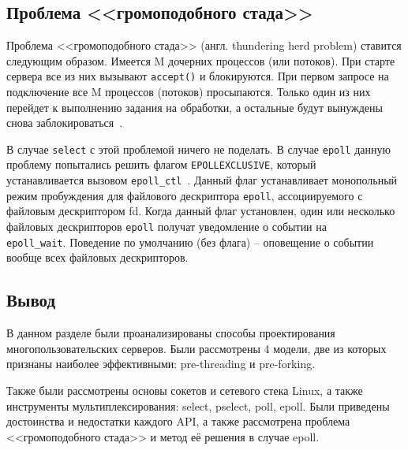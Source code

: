 \subsection{Проблема <<громоподобного стада>>}

Проблема <<громоподобного стада>> (англ. thundering herd problem) ставится следующим образом. Имеется M дочерних процессов (или потоков). При старте сервера все из них вызывают \texttt{accept()} и блокируются. При первом запросе на подключение все M процессов (потоков) просыпаются. Только один из них перейдет к выполнению задания на обработки, а остальные будут вынуждены снова заблокироваться~\cite{Tiwari2012ASP}.

В случае \texttt{select} с этой проблемой ничего не поделать. В случае \texttt{epoll} данную проблему попытались решить флагом \texttt{EPOLLEXCLUSIVE}, который \\устанавливается вызовом \texttt{epoll\_ctl}~\cite{man-epoll-ctl}. Данный флаг устанавливает монопольный режим пробуждения для файлового дескриптора \texttt{epoll}, ассоциируемого с файловым дескриптором fd. Когда данный флаг установлен, один или несколько файловых дескрипторов \texttt{epoll} получат уведомление о событии на \\\texttt{epoll\_wait}. Поведение по умолчанию (без флага) -- оповещение о событии вообще всех файловых дескрипторов.


\subsection*{Вывод}

В данном разделе были проанализированы способы проектирования многопользовательских серверов. Были рассмотрены 4 модели, две из которых признаны наиболее эффективными: pre-threading и pre-forking. 

Также были рассмотрены основы сокетов и сетевого стека Linux, а также инструменты мультиплексирования: select, pselect, poll, epoll. Были приведены достоинства и недостатки каждого API, а также рассмотрена проблема <<громоподобного стада>> и метод её решения в случае epoll.

\pagebreak
